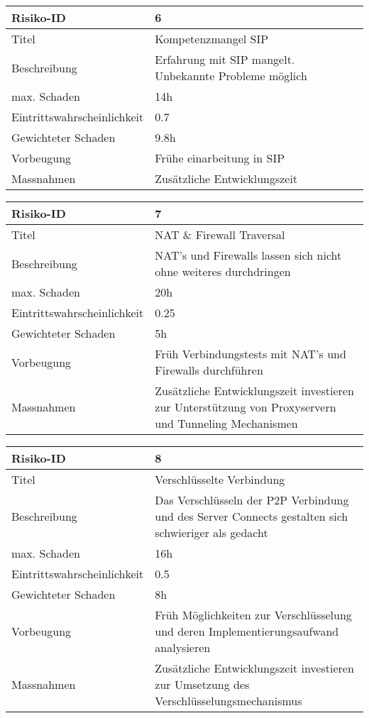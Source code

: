 	
\noindent
\begin{tabular}{|p{} | p{} |}
	\hline	
	Risiko-ID & 6 \\
	\hline
	Titel & Kompetenzmangel SIP \\
	Beschreibung & Erfahrung mit SIP mangelt. Unbekannte Probleme möglich \\
	max. Schaden	& 14h \\
	Eintrittswahrscheinlichkeit & 0.7 \\
	Gewichteter Schaden	& 9.8h \\
	Vorbeugung	& Frühe einarbeitung in SIP \\
	Massnahmen	& Zusätzliche Entwicklungszeit \\
	\hline
\end{tabular}
\hspace{0.5cm}
\newline


\noindent
\begin{tabular}{|p{} | p{} |}
	\hline	
	Risiko-ID & 7 \\
	\hline
	Titel & NAT \& Firewall Traversal \\
	Beschreibung & NAT's und Firewalls lassen sich nicht ohne weiteres durchdringen \\
	max. Schaden	& 20h \\
	Eintrittswahrscheinlichkeit & 0.25 \\
	Gewichteter Schaden	& 5h \\
	Vorbeugung	& Früh Verbindungstests mit NAT's und Firewalls durchführen \\
	Massnahmen	& Zusätzliche Entwicklungszeit investieren zur Unterstützung von Proxyservern und Tunneling Mechanismen \\
	\hline
\end{tabular}
\hspace{0.5cm}
\newline


\noindent
\begin{tabular}{|p{} | p{} |}
	\hline	
	Risiko-ID & 8 \\
	\hline
	Titel & Verschlüsselte Verbindung \\
	Beschreibung & Das Verschlüsseln der P2P Verbindung und des Server Connects gestalten sich schwieriger als gedacht \\
	max. Schaden	& 16h \\
	Eintrittswahrscheinlichkeit & 0.5 \\
	Gewichteter Schaden	& 8h \\
	Vorbeugung	& Früh Möglichkeiten zur Verschlüsselung und deren Implementierungsaufwand analysieren \\
	Massnahmen	& Zusätzliche Entwicklungszeit investieren zur Umsetzung des Verschlüsselungsmechanismus \\
	\hline
\end{tabular}
\hspace{0.5cm}
\newline


